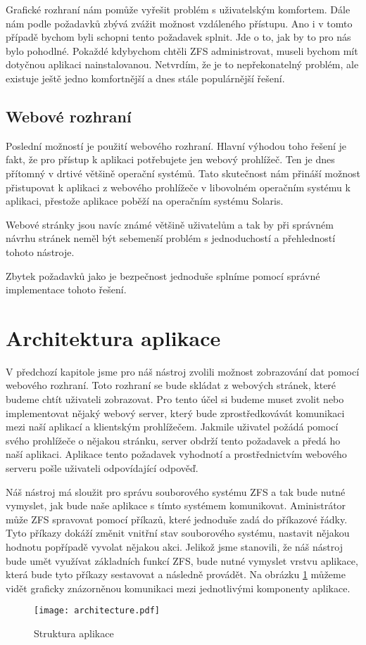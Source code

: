     Grafické rozhraní nám pomůže vyřešit problém s uživatelským komfortem. Dále nám podle požadavků zbývá zvážit možnost vzdáleného přístupu. Ano i v tomto případě bychom byli schopni tento požadavek splnit. Jde o to, jak by to pro nás bylo pohodlné. Pokaždé kdybychom chtěli ZFS administrovat, museli bychom mít dotyčnou aplikaci nainstalovanou. Netvrdím, že je to nepřekonatelný problém, ale existuje ještě jedno komfortnější a dnes stále populárnější řešení.
    \subsection{Webové rozhraní}
    Poslední možností je použití webového rozhraní. Hlavní výhodou toho řešení je fakt, že pro přístup k aplikaci potřebujete jen webový prohlížeč. Ten je dnes přítomný v drtivé většině operační systémů. Tato skutečnost nám přináší možnost přistupovat k aplikaci z webového prohlížeče v libovolném operačním systému k aplikaci, přestože aplikace poběží na operačním systému Solaris.

    Webové stránky jsou navíc známé většině uživatelům a tak by při správném návrhu stránek neměl být sebemenší problém s jednoduchostí a přehledností tohoto nástroje.

    Zbytek požadavků jako je bezpečnost jednoduše splníme pomocí správné implementace tohoto řešení.
\section{Architektura aplikace}
V předchozí kapitole jsme pro náš nástroj zvolili možnost zobrazování dat pomocí webového rozhraní. Toto rozhraní se bude skládat z webových stránek, které budeme chtít uživateli zobrazovat. Pro tento účel si budeme muset zvolit nebo implementovat nějaký webový server, který bude zprostředkovávát komunikaci mezi naší aplikací a klientským prohlížečem. Jakmile uživatel požádá pomocí svého prohlížeče o nějakou stránku, server obdrží tento požadavek a předá ho naší aplikaci. Aplikace tento požadavek vyhodnotí a prostřednictvím webového serveru pošle uživateli odpovídající odpověď.

Náš nástroj má sloužit pro správu souborového systému ZFS a tak bude nutné vymyslet, jak bude naše aplikace s tímto systémem komunikovat. Aministrátor může ZFS spravovat pomocí příkazů, které jednoduše zadá do příkazové řádky. Tyto příkazy dokáží změnit vnitřní stav souborového systému, nastavit nějakou hodnotu popřípadě vyvolat nějakou akci. Jelikož jsme stanovili, že náš nástroj bude umět využívat základních funkcí ZFS, bude nutné vymyslet vrstvu aplikace, která bude tyto příkazy sestavovat a následně provádět. Na obrázku \ref{architecture} můžeme vidět graficky znázorněnou komunikaci mezi jednotlivými komponenty aplikace.
\begin{figure}[h]
        \caption{Struktura aplikace}
        \label{architecture}
        \centering
        \texttt{[image: architecture.pdf]}
\end{figure}
